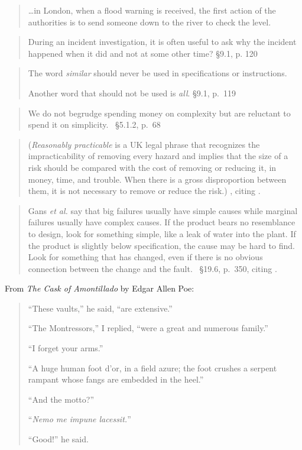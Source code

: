 \documentclass[a4paper]{article}
\begin{document}
\medskip
\begin{quote}
	\ldots in London, when a flood warning is received, the first
	action of the authorities is to send someone down to the river
	to check the level.~\citet[\S 14.6.1, p.~186]{Kletz2003}
\end{quote}

\medskip
\begin{quote}
	During an incident investigation, it is often useful to ask
	why the incident happened when it did and not at some other time?
	\cite{Kletz2003} \S 9.1, p. 120
\end{quote}

\medskip
\begin{quote}
	The word \emph{similar} should never be used in specifications
	or instructions.

	Another word that should not be used is \emph{all}.
	\cite{Kletz2003} \S 9.1, p.~119
\end{quote}

\medskip
\begin{quote}
	We do not begrudge spending money on complexity but are reluctant
	to spend it on simplicity.~\cite{Kletz2003} \S 5.1.2, p.~68
\end{quote}

\medskip
\begin{quote}
	(\emph{Reasonably practicable} is a UK legal phrase that recognizes
	the impracticability of removing every hazard and implies that the
	size of a risk should be compared with the cost of removing or
	reducing it, in money, time, and trouble.  When there is a gross
	disproportion between them, it is not necessary to remove or reduce
	the risk.) \citet[Chapter 4, p.~63]{Kletz2003}, citing \cite{HSE2001}.
\end{quote}

\medskip
\begin{quote}
	Gans \emph{et al.} say that big failures usually have simple causes
	while marginal failures usually have complex causes.  If the product
	bears no resemblance to design, look for something simple, like a
	leak of water into the plant.  If the product is slightly below
	specification, the cause may be hard to find.  Look for something
	that has changed, even if there is no obvious connection between the
	change and the fault.~\cite{Kletz1999} \S 19.6, p.\ 350, citing \cite{Gans1991}.
\end{quote}

\medskip
From \emph{The Cask of Amontillado} by Edgar Allen Poe:
\begin{quote}
	``These vaults,'' he said, ``are extensive.''

	``The Montressors,'' I replied, ``were a great and numerous family.''

	``I forget your arms.''

	``A huge human foot d'or, in a field azure; the foot crushes a serpent
	rampant whose fangs are embedded in the heel.''

	``And the motto?''

	``\emph{Nemo me impune lacessit.}''

	``Good!'' he said.
\end{quote}
\end{document}
